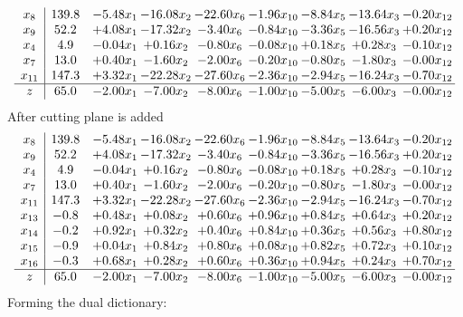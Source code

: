 \documentclass[8pt]{article}
\begin{document}
\[\begin{array}{c| c c@{\hskip 2pt} c@{\hskip 2pt} c@{\hskip 2pt} c@{\hskip 2pt} c@{\hskip 2pt} c@{\hskip 2pt} c@{\hskip 2pt} }
 x_{8}   &  139.8 & -5.48 x_{1} & -16.08 x_{2} & -22.60 x_{6} & -1.96 x_{10} & -8.84 x_{5} & -13.64 x_{3} & -0.20 x_{12}\\
 x_{9}   &  52.2 & +  4.08 x_{1} & -17.32 x_{2} & -3.40 x_{6} & -0.84 x_{10} & -3.36 x_{5} & -16.56 x_{3} & +  0.20 x_{12}\\
 x_{4}   &  4.9 & -0.04 x_{1} & +  0.16 x_{2} & -0.80 x_{6} & -0.08 x_{10} & +  0.18 x_{5} & +  0.28 x_{3} & -0.10 x_{12}\\
 x_{7}   &  13.0 & +  0.40 x_{1} & -1.60 x_{2} & -2.00 x_{6} & -0.20 x_{10} & -0.80 x_{5} & -1.80 x_{3} & -0.00 x_{12}\\
 x_{11}   &  147.3 & +  3.32 x_{1} & -22.28 x_{2} & -27.60 x_{6} & -2.36 x_{10} & -2.94 x_{5} & -16.24 x_{3} & -0.70 x_{12}\\
\hline
z    &  65.0 & -2.00 x_{1} & -7.00 x_{2} & -8.00 x_{6} & -1.00 x_{10} & -5.00 x_{5} & -6.00 x_{3} & -0.00 x_{12}\\
\end{array}\]
 After cutting plane is added 
\[\begin{array}{c| c c@{\hskip 2pt} c@{\hskip 2pt} c@{\hskip 2pt} c@{\hskip 2pt} c@{\hskip 2pt} c@{\hskip 2pt} c@{\hskip 2pt} }
 x_{8}   &  139.8 & -5.48 x_{1} & -16.08 x_{2} & -22.60 x_{6} & -1.96 x_{10} & -8.84 x_{5} & -13.64 x_{3} & -0.20 x_{12}\\
 x_{9}   &  52.2 & +  4.08 x_{1} & -17.32 x_{2} & -3.40 x_{6} & -0.84 x_{10} & -3.36 x_{5} & -16.56 x_{3} & +  0.20 x_{12}\\
 x_{4}   &  4.9 & -0.04 x_{1} & +  0.16 x_{2} & -0.80 x_{6} & -0.08 x_{10} & +  0.18 x_{5} & +  0.28 x_{3} & -0.10 x_{12}\\
 x_{7}   &  13.0 & +  0.40 x_{1} & -1.60 x_{2} & -2.00 x_{6} & -0.20 x_{10} & -0.80 x_{5} & -1.80 x_{3} & -0.00 x_{12}\\
 x_{11}   &  147.3 & +  3.32 x_{1} & -22.28 x_{2} & -27.60 x_{6} & -2.36 x_{10} & -2.94 x_{5} & -16.24 x_{3} & -0.70 x_{12}\\
 x_{13}   &  -0.8 & +  0.48 x_{1} & +  0.08 x_{2} & +  0.60 x_{6} & +  0.96 x_{10} & +  0.84 x_{5} & +  0.64 x_{3} & +  0.20 x_{12}\\
 x_{14}   &  -0.2 & +  0.92 x_{1} & +  0.32 x_{2} & +  0.40 x_{6} & +  0.84 x_{10} & +  0.36 x_{5} & +  0.56 x_{3} & +  0.80 x_{12}\\
 x_{15}   &  -0.9 & +  0.04 x_{1} & +  0.84 x_{2} & +  0.80 x_{6} & +  0.08 x_{10} & +  0.82 x_{5} & +  0.72 x_{3} & +  0.10 x_{12}\\
 x_{16}   &  -0.3 & +  0.68 x_{1} & +  0.28 x_{2} & +  0.60 x_{6} & +  0.36 x_{10} & +  0.94 x_{5} & +  0.24 x_{3} & +  0.70 x_{12}\\
\hline
z    &  65.0 & -2.00 x_{1} & -7.00 x_{2} & -8.00 x_{6} & -1.00 x_{10} & -5.00 x_{5} & -6.00 x_{3} & -0.00 x_{12}\\
\end{array}\]
Forming the dual dictionary:
\end{document}
